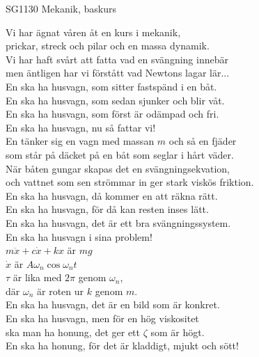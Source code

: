 \documentclass[a6paper,10pt]{article}
\begin{document}
\setlength{\oddsidemargin}{-0.37in}
\noindent
\begin{center}
\footnotesize SG1130 Mekanik, baskurs\\
\end{center}
\begin{lyrics}
Vi har ägnat våren åt en kurs i mekanik, \\
prickar, streck och pilar och en massa dynamik. \\
Vi har haft svårt att fatta vad en svängning innebär\\ 
men äntligen har vi förstått vad Newtons lagar lär...
\vspace{5pt} \\
En ska ha husvagn, som sitter fastspänd i en båt. \\
En ska ha husvagn, som sedan sjunker och blir våt. \\
En ska ha husvagn, som först är odämpad och fri. \\
En ska ha husvagn, nu så fattar vi! 
\vspace{5pt} \\
En tänker sig en vagn med massan $m$ och så en fjäder \\
som står på däcket på en båt som seglar i hårt väder. \\
När båten gungar skapas det en svängningsekvation, \\
och vattnet som sen strömmar in ger stark viskös friktion. 
\vspace{5pt} \\
En ska ha husvagn, då kommer en att räkna rätt. \\
En ska ha husvagn, för då kan resten inses lätt. \\
En ska ha husvagn, det är ett bra svängningssystem. \\
En ska ha husvagn i sina problem! 
\vspace{5pt} \\
$m \ddot{x} + c \dot{x} + k x$ är $m g$ \\
$\dot{x}$ är $A \omega_n \cos \omega_n t$ \\
$\tau$ är lika med $2\pi$ genom $\omega_n$, \\
där $\omega_n$ är roten ur $k$ genom $m$.
\vspace{5pt} \\
En ska ha husvagn, det är en bild som är konkret. \\
En ska ha husvagn, men för en hög viskositet \\
ska man ha honung, det ger ett $\zeta$ som är högt. \\
En ska ha honung, för det är kladdigt, mjukt och sött! 
\end{lyrics}
\end{document}
